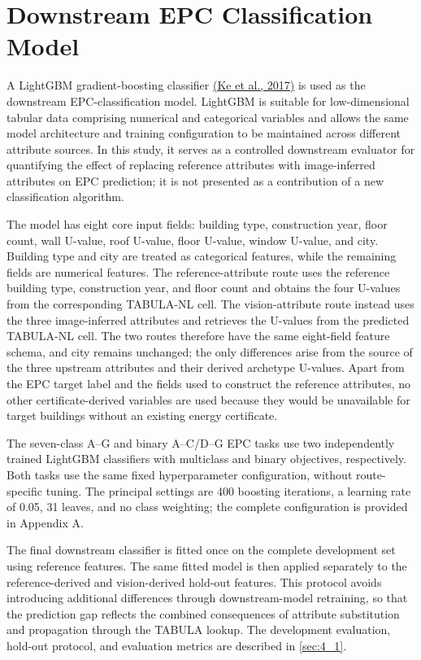 \section{Downstream EPC Classification Model}
\label{sec:3_5}


A LightGBM gradient-boosting classifier \hyperlink{ref:ke2017}{(Ke et al., 2017)} is used as the downstream EPC-classification model. LightGBM is suitable for low-dimensional tabular data comprising numerical and categorical variables and allows the same model architecture and training configuration to be maintained across different attribute sources. In this study, it serves as a controlled downstream evaluator for quantifying the effect of replacing reference attributes with image-inferred attributes on EPC prediction; it is not presented as a contribution of a new classification algorithm.


The model has eight core input fields: building type, construction year, floor count, wall U-value, roof U-value, floor U-value, window U-value, and city. Building type and city are treated as categorical features, while the remaining fields are numerical features. The reference-attribute route uses the reference building type, construction year, and floor count and obtains the four U-values from the corresponding TABULA-NL cell. The vision-attribute route instead uses the three image-inferred attributes and retrieves the U-values from the predicted TABULA-NL cell. The two routes therefore have the same eight-field feature schema, and city remains unchanged; the only differences arise from the source of the three upstream attributes and their derived archetype U-values. Apart from the EPC target label and the fields used to construct the reference attributes, no other certificate-derived variables are used because they would be unavailable for target buildings without an existing energy certificate.


The seven-class A--G and binary A--C/D--G EPC tasks use two independently trained LightGBM classifiers with multiclass and binary objectives, respectively. Both tasks use the same fixed hyperparameter configuration, without route-specific tuning. The principal settings are 400 boosting iterations, a learning rate of 0.05, 31 leaves, and no class weighting; the complete configuration is provided in Appendix A.


The final downstream classifier is fitted once on the complete development set using reference features. The same fitted model is then applied separately to the reference-derived and vision-derived hold-out features. This protocol avoids introducing additional differences through downstream-model retraining, so that the prediction gap reflects the combined consequences of attribute substitution and propagation through the TABULA lookup. The development evaluation, hold-out protocol, and evaluation metrics are described in \cref{sec:4_1}.
